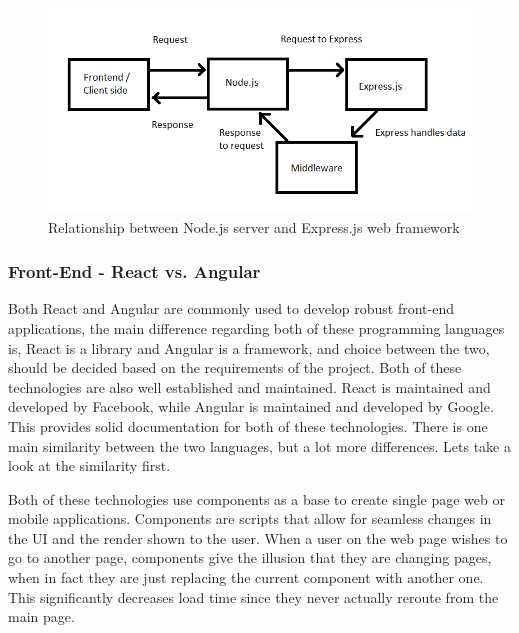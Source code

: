 \begin{figure}
    \centering
    \includegraphics[scale=0.7]{img/node-express.png}
    \caption{Relationship between Node.js server and Express.js web framework}
    \label{fig2:node}
\end{figure}

\subsubsection{Front-End - React vs. Angular}
Both React and Angular are commonly used to develop robust front-end applications, the main difference regarding both of these programming languages is, React is a library and Angular is a framework, and choice between the two, should be decided based on the requirements of the project. Both of these technologies are also well established and maintained. React is maintained and developed by Facebook, while Angular is maintained and developed by Google. This provides solid documentation for both of these technologies. There is one main similarity between the two languages, but a lot more differences. Lets take a look at the similarity first.

Both of these technologies use components as a base to create single page web or mobile applications. Components are scripts that allow for seamless changes in the UI and the render shown to the user. When a user on the web page wishes to go to another page, components give the illusion that they are changing pages, when in fact they are just replacing the current component with another one. This significantly decreases load time since they never actually reroute from the main page.

